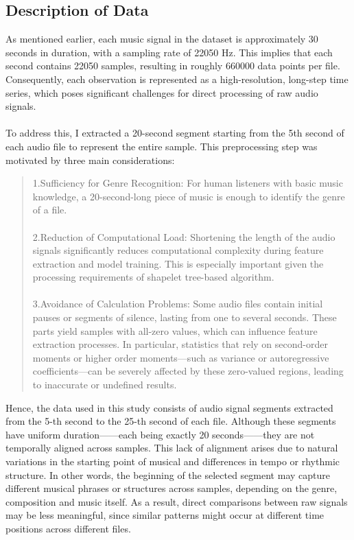 \subsection{Description of Data}
As mentioned earlier, each music signal in the dataset is approximately 30 seconds in duration, with a sampling rate of 22050 Hz. This implies that each second contains 22050 samples, resulting in roughly 660000 data points per file. Consequently, each observation is represented as a high-resolution, long-step time series, which poses significant challenges for direct processing of raw audio signals. \\
\\
To address this, I extracted a 20-second segment starting from the 5th second of each audio file to represent the entire sample. This preprocessing step was motivated by three main considerations:
\begin{quote}
	1.Sufficiency for Genre Recognition: For human listeners with basic music knowledge, a 20-second-long piece of music is enough to identify the genre of a file.\\
	\\
	2.Reduction of Computational Load: Shortening the length of the audio signals significantly reduces computational complexity during feature extraction and model training. This is especially important given the processing requirements of shapelet tree-based algorithm.\\
	\\
	3.Avoidance of Calculation Problems: Some audio files contain initial pauses or segments of silence, lasting from one to several seconds. These parts yield samples with all-zero values, which can influence feature extraction processes. In particular, statistics that rely on second-order moments or higher order moments—such as variance or autoregressive coefficients—can be severely affected by these zero-valued regions, leading to inaccurate or undefined results.
\end{quote}
Hence, the data used in this study consists of audio signal segments extracted from the 5-th second to the 25-th second of each file. Although these segments have uniform duration——each being exactly 20 seconds——they are not temporally aligned across samples. This lack of alignment arises due to natural variations in the starting point of musical and differences in tempo or rhythmic structure. In other words, the beginning of the selected segment may capture different musical phrases or structures across samples, depending on the genre, composition and music itself. As a result, direct comparisons between raw signals may be less meaningful, since similar patterns might occur at different time positions across different files. \\
\\

